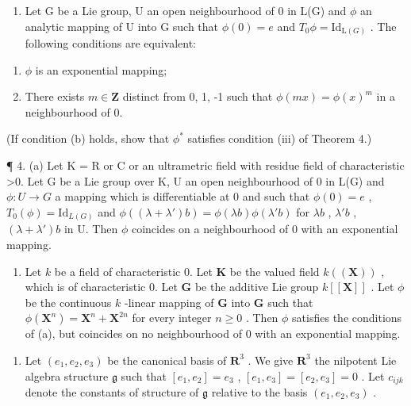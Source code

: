 \begin{enumerate}
\def\labelenumi{\arabic{enumi}.}
\setcounter{enumi}{2}
\tightlist
\item
  Let G be a Lie group, U an open neighbourhood of 0 in L(G) and \(\phi\) an analytic mapping of U into G such that \(\phi(0) = e\) and \(T_{0}\phi = \mathrm{Id}_{\mathrm{L}(G)}\) . The following conditions are equivalent:
\end{enumerate}

\begin{enumerate}
\def\labelenumi{(\alph{enumi})}
\item
  \(\phi\) is an exponential mapping;
\item
  There exists \(m \in \mathbf{Z}\) distinct from 0, 1, -1 such that \(\phi(mx) = \phi(x)^m\) in a neighbourhood of 0.
\end{enumerate}

(If condition (b) holds, show that \(\phi^{*}\) satisfies condition (iii) of Theorem 4.)

¶ 4. (a) Let K = R or C or an ultrametric field with residue field of characteristic \textgreater0. Let G be a Lie group over K, U an open neighbourhood of 0 in L(G) and \(\phi: U \to G\) a mapping which is differentiable at 0 and such
that \(\phi(0) = e\) , \(T_0(\phi) = \mathrm{Id}_{L(G)}\) and \(\phi((\lambda + \lambda')b) = \phi(\lambda b)\phi(\lambda'b)\) for \(\lambda b\) , \(\lambda'b\) , \((\lambda + \lambda')b\) in U. Then \(\phi\) coincides on a neighbourhood of 0 with an exponential mapping.

\begin{enumerate}
\def\labelenumi{(\alph{enumi})}
\setcounter{enumi}{1}
\tightlist
\item
  Let \(k\) be a field of characteristic 0. Let \(\mathbf{K}\) be the valued field \(k((\mathbf{X}))\) , which is of characteristic 0. Let \(\mathbf{G}\) be the additive Lie group \(k[[\mathbf{X}]]\) . Let \(\phi\) be the continuous \(k\) -linear mapping of \(\mathbf{G}\) into \(\mathbf{G}\) such that \(\phi(\mathbf{X}^n) = \mathbf{X}^n + \mathbf{X}^{2n}\) for every integer \(n \geqslant 0\) . Then \(\phi\) satisfies the conditions of (a), but coincides on no neighbourhood of 0 with an exponential mapping.
\end{enumerate}

\begin{enumerate}
\def\labelenumi{\arabic{enumi}.}
\setcounter{enumi}{4}
\tightlist
\item
  Let \((e_1, e_2, e_3)\) be the canonical basis of \(\mathbf{R}^3\) . We give \(\mathbf{R}^3\) the nilpotent Lie algebra structure \(\mathfrak{g}\) such that \([e_1, e_2] = e_3\) , \([e_1, e_3] = [e_2, e_3] = 0\) . Let \(c_{ijk}\) denote the constants of structure of \(\mathfrak{g}\) relative to the basis \((e_1, e_2, e_3)\) .
\end{enumerate}

